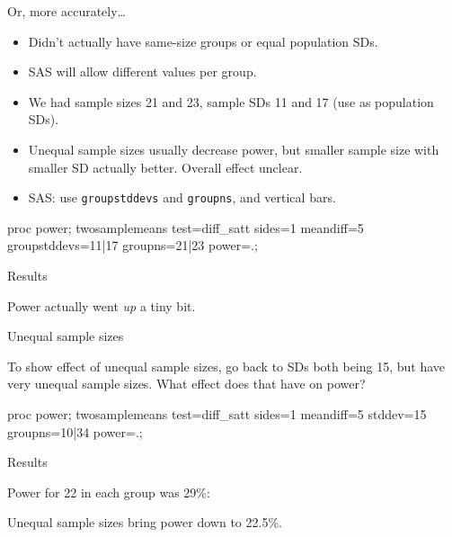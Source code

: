 \documentclass[unknownkeysallowed]{beamer}\usepackage[]{graphicx}\usepackage[]{color}
\begin{document}
\begin{frame}[fragile]{Or, more accurately\ldots}

  \begin{itemize}
  \item Didn't actually have same-size groups or equal population
    SDs. 
  \item SAS will allow different values per group.
  \item We had sample sizes 21 and 23, sample SDs 11 and 17 (use as
    population SDs).
  \item Unequal sample sizes usually decrease power, but smaller
    sample size with smaller SD actually better. Overall effect unclear.
  \item SAS: use \texttt{groupstddevs} and \texttt{groupns}, and
    vertical bars.
  \end{itemize}

\begin{Sascode}[store=il,fontsize=footnotesize]
  proc power;
  twosamplemeans
    test=diff_satt
    sides=1
    meandiff=5
    groupstddevs=11|17
    groupns=21|23
    power=.;
\end{Sascode}

  
\end{frame}

\begin{frame}[fragile]{Results}


Power actually went \emph{up} a tiny bit.

  
\end{frame}

\begin{frame}[fragile]{Unequal sample sizes}

To show effect of unequal sample sizes, go back to SDs both being 15,
but have very unequal sample sizes. What effect does that have on
power?


\begin{Sascode}[store=im]
  proc power;
  twosamplemeans
    test=diff_satt
    sides=1
    meandiff=5
    stddev=15
    groupns=10|34
    power=.;
\end{Sascode}

  
\end{frame}

\begin{frame}[fragile]{Results}

Power for 22 in each group was 29\%:


Unequal sample sizes bring power down to 22.5\%.
  
\end{frame}
\end{document}
